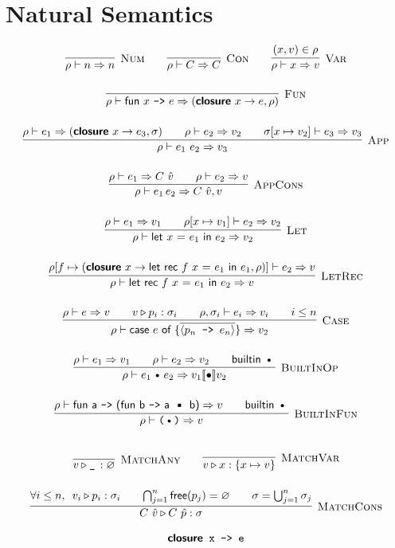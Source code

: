 \documentclass{article}
\def\code#1{\textsf{#1}}
\def\rt{\Rightarrow}
\def\binop{\, \text{\textbullet}\, }
\def\envj#1#2#3{#1 \vdash #2 \rt #3}
\def\closure#1#2#3{(\textsf{\textbf{closure}} \ #1 \to #2,#3)}
\def\tsc#1{\textsc{#1}}
\def\matchj#1#2#3{#1 \triangleright #2 : #3}
\begin{document}
\section*{Natural Semantics}

\begin{gather*}
\infer[\tsc{Num}]{\envj \rho n n}{}\qquad
\infer[\tsc{Con}]{\envj \rho C C}{}\qquad
\infer[\tsc{Var}]{\envj \rho x v}{(x,v)\in \rho}\\[12pt]
\infer[\tsc{Fun}]{\envj \rho {\code{fun $x$ \texttt{->} $e$}} {\closure x e \rho}}{}\\[12pt]
\infer[\tsc{App}]{\envj \rho {e_1 \ e_2} v_3}{\envj{\rho}{e_1}{\closure x {e_3} {\sigma}} && \envj \rho {e_2} {v_2} && \envj{\sigma [x\mapsto v_2]}{e_3}{v_3}}\\[12pt]
\infer[\tsc{AppCons}]{\envj{\rho}{e_1\, e_2}{C\ \hat{v},v}}{\envj{\rho}{e_1}{C\ \hat{v}} && \envj{\rho}{e_2}{v}}\\[12pt]
\infer[\tsc{Let}]{\envj \rho {\code{let $x$ = $e_1$ in $e_2$}} {v_2}}{\envj \rho {e_1} {v_1} && \envj {\rho[x\mapsto v_1]} {e_2} {v_2}}\\[12pt]
\infer[\tsc{LetRec}]{\envj \rho {\code{let rec $f$ $x$ = $e_1$ in $e_2$}} {v}}{\envj{\rho[f \mapsto \closure x {\code{let rec $f$ $x$ = $e_1$ in $e_1$}}{\rho}]}{e_2}{v}}\\[12pt]
\infer[\tsc{Case}]{\envj \rho {\code{case $e$ of \{$\overline{\langle p_n \texttt{ -> } e_n\rangle}$\}}} {v_2}}{\envj \rho {e} {v} && v\triangleright p_i : \sigma_i && \envj {\rho,\sigma_i}{e_i}{v_i} && i \leq n}\\[12pt]
\infer[\tsc{BuiltInOp}]{\envj \rho {e_1 \binop e_2} {v_1\llbracket\bullet \rrbracket v_2}}{\envj \rho {e_1} {v_1} && \envj {\rho} {e_2} {v_2} && \textsf{builtin}\, \binop}\\[12pt]
\infer[\tsc{BuiltInFun}]{\envj \rho {\texttt{($\binop$)}} {v}}{\envj \rho {\code{fun a \texttt{->} (fun b \texttt{->} a $\binop$ b)}} {v} && \textsf{builtin}\, \binop}\\[12pt]
\end{gather*}

\begin{gather*}
\infer[\tsc{MatchAny}]{\matchj v {\texttt{\_}\,} \varnothing}{}\qquad
\infer[\tsc{MatchVar}]{\matchj v x {\{x\mapsto v\}}}{}\\[12pt]
\infer[\tsc{MatchCons}]{\matchj {C\ \hat{v}} {C\ \hat{p}} \sigma}{\forall i \leq n,\ \, \matchj{v_i}{p_i}{\sigma_i} && \bigcap_{j=1}^n \textsf{free}(p_j)=\varnothing && \sigma = \bigcup_{j=1}^n \sigma_j}	
\end{gather*}

\begin{gather*}
\texttt{\textsf{\textbf{closure}} x -> e}	
\end{gather*}
\end{document}
